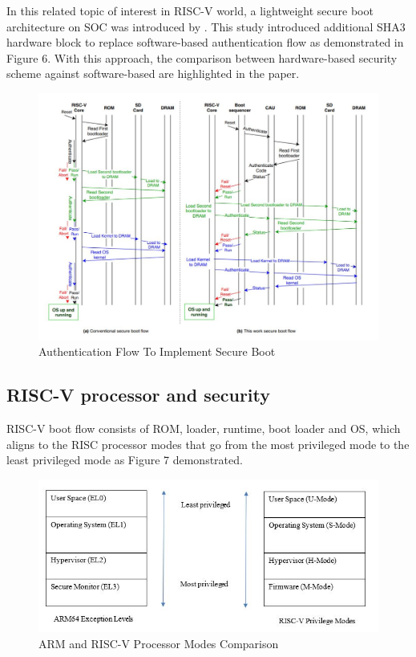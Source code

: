 \documentclass[]{rsos}%
\begin{document}
In this related topic of interest in RISC-V world, a lightweight secure boot architecture on SOC was
introduced by  \cite{R5:12}. This study
introduced additional SHA3 hardware block to replace software-based authentication flow as
demonstrated in Figure 6. With this approach, the comparison between hardware-based security
scheme against software-based are highlighted in the paper.

\begin{figure}[H]
	\centering
	\includegraphics[width=1\textwidth]{figs/AuthenticationFlowToImplementSecureBoot.JPG}
	\caption{Authentication Flow To Implement Secure Boot \cite{R5:12}}
\end{figure}


\subsection{ RISC-V processor and security}
RISC-V boot flow consists of ROM, loader, runtime, boot loader and OS, which aligns to the RISC processor modes that go from the most privileged mode to the least privileged mode as Figure 7 demonstrated. 

\begin{figure}[hbt!]
	\centering
	\includegraphics{figs/ArmAndRiscVProcessorModesComparison.JPG}
	\caption{ARM and RISC-V Processor Modes Comparison}
\end{figure}
\end{document}
